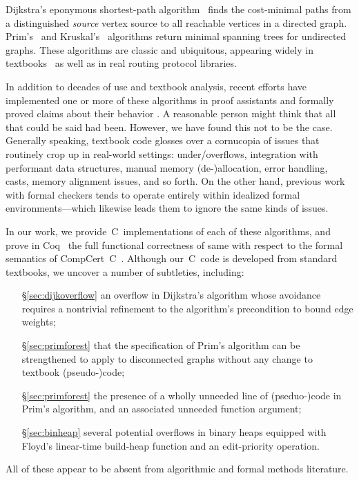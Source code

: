 Dijkstra's eponymous shortest-path algorithm~\cite{DBLP:journals/nm/Dijkstra59} finds
the cost-minimal paths from a distinguished \emph{source} vertex
source to all reachable vertices in a directed graph. Prim's~\cite{prim2:prim} and Kruskal's~\cite{kruskal} algorithms return minimal spanning trees for undirected graphs.
These algorithms are classic and ubiquitous, appearing widely in textbooks~\cite{clrs,DBLP:books/daglib/0022194,heineman2008algorithms,rozen,kepnergilbert,sedgewick} as well as in real routing protocol libraries.

In addition to decades of use and textbook analysis, recent efforts have implemented one or more of these algorithms in proof
assistants and formally proved claims about their behavior \cite{chen2003dijkstra,Moore2005,arthur,cite,cite}.  A reasonable person might think that all
that could be said had been.  However, we have found this not to be the case.  Generally speaking, textbook code glosses over a cornucopia
of issues that routinely crop up in real-world settings: under/overflows, integration with performant data structures, manual memory (de-)allocation,
error handling, casts, memory alignment issues, and so forth.  On the other hand, previous work with formal checkers tends to operate entirely
within idealized formal environments---which likewise leads them to ignore the same kinds of issues.

In our work, we provide~C~implementations of each of these algorithms, and prove in Coq~\cite{Coq} the full functional correctness of same with respect to
the formal semantics of CompCert~C~\cite{leroy:compcert}.  Although our~C~code is developed from standard textbooks, we uncover a number of subtleties, including:
\begin{itemize}
\item[\S\ref{sec:dijkoverflow}] an overflow in Dijkstra's algorithm whose avoidance requires a nontrivial refinement to the algorithm's precondition to bound edge weights;
\item[\S\ref{sec:primforest}] that the specification of Prim's algorithm can be strengthened to apply to disconnected graphs without any change to textbook (pseudo-)code;
\item[\S\ref{sec:primforest}] the presence of a wholly unneeded line of (pseduo-)code in Prim's algorithm, and an associated unneeded function argument;
\item[\S\ref{sec:binheap}] several potential overflows in binary heaps equipped with Floyd's linear-time build-heap function and an edit-priority operation.
\end{itemize}
All of these appear to be absent from algorithmic and formal methods literature.

